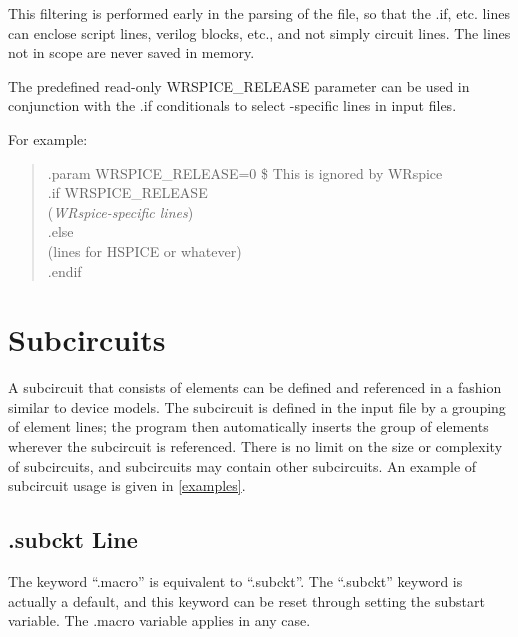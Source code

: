 This filtering is performed early in the parsing of the file, so that
the {\vt .if}, etc.  lines can enclose script lines, verilog blocks,
etc., and not simply circuit lines.  The lines not in scope are never
saved in memory.

The predefined read-only {\vt WRSPICE\_RELEASE} parameter can be used
in conjunction with the {\vt .if} conditionals to select
{\WRspice}-specific lines in input files.

For example:
\begin{quote}\vt
.param WRSPICE\_RELEASE=0  \$ This is ignored by WRspice\\
.if WRSPICE\_RELEASE\\
({\it WRspice-specific lines\/})\\
.else\\
({\vt lines for HSPICE or whatever\/})\\
.endif
\end{quote}


\section{Subcircuits}


A subcircuit that consists of {\WRspice} elements can be defined and
referenced in a fashion similar to device models.  The subcircuit is
defined in the input file by a grouping of element lines; the program
then automatically inserts the group of elements wherever the
subcircuit is referenced.  There is no limit on the size or complexity
of subcircuits, and subcircuits may contain other subcircuits.  An
example of subcircuit usage is given in \ref{examples}.

\subsection{{\vt .subckt} Line}

The keyword ``{\vt .macro}'' is equivalent to ``{\vt .subckt}''.  The
``{\vt .subckt}'' keyword is actually a default, and this keyword can
be reset through setting the {\et substart} variable.  The {\vt
.macro} variable applies in any case.

